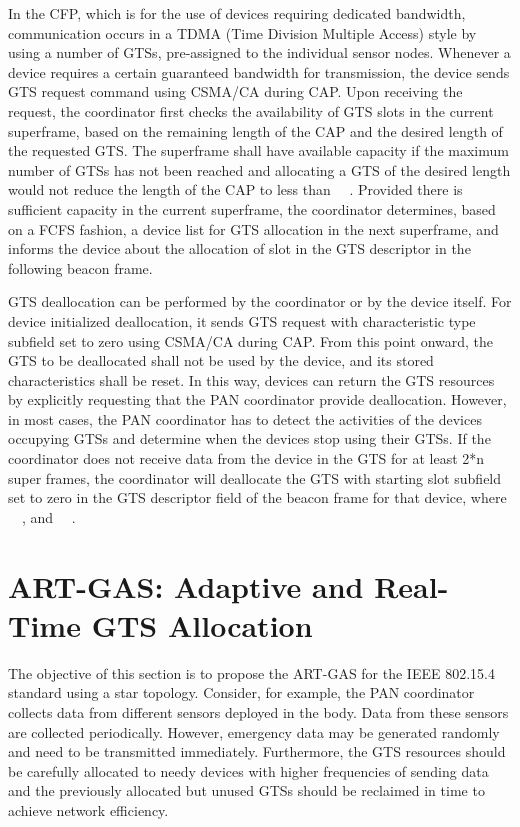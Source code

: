 \documentclass[letterpaper]{sig-alternate-10pt}
\begin{document}
In the CFP, which is for the use of devices requiring dedicated bandwidth, communication occurs in a TDMA (Time Division Multiple Access) style by using a number of GTSs, pre-assigned to the individual sensor nodes. Whenever a device requires a certain guaranteed bandwidth for transmission, the device sends GTS request command using CSMA/CA during CAP. Upon receiving the request, the coordinator first checks the availability of GTS slots in the current superframe, based on the remaining length of the CAP and the desired length of the requested GTS. The superframe shall have available capacity if the maximum number of GTSs has not been reached and allocating a GTS of the desired length would not reduce the length of the CAP to less than ~~. Provided there is sufficient capacity in the current superframe, the coordinator determines, based on a FCFS fashion, a device list for GTS allocation in the next superframe, and informs the device about the allocation of slot in the GTS descriptor in the following beacon frame.

GTS deallocation can be performed by the coordinator or by the device itself. For device initialized deallocation, it sends GTS request with characteristic type subfield set to zero using CSMA/CA during CAP. From this point onward, the GTS to be deallocated shall not be used by the device, and its stored characteristics shall be reset. In this way, devices can return the GTS resources by explicitly requesting that the PAN coordinator provide deallocation. However, in most cases, the PAN coordinator has to detect the activities of the devices occupying GTSs and determine when the devices stop using their GTSs. If the coordinator does not receive data from the device in the GTS for at least 2*n super frames, the coordinator will deallocate the GTS with starting slot subfield set to zero in the GTS descriptor field of the beacon frame for that device, where ~~, and ~~.


\section{ART-GAS: Adaptive and Real-Time GTS Allocation}
The objective of this section is to propose the ART-GAS for the IEEE 802.15.4 standard using a star topology. Consider, for example, the PAN coordinator collects data from different sensors deployed in the body. Data from these sensors are collected periodically. However, emergency data may be generated randomly and need to be transmitted immediately. Furthermore, the GTS resources should be carefully allocated to needy devices with higher frequencies of sending data and the previously allocated but unused GTSs should be reclaimed in time to achieve network efficiency.
\end{document}
